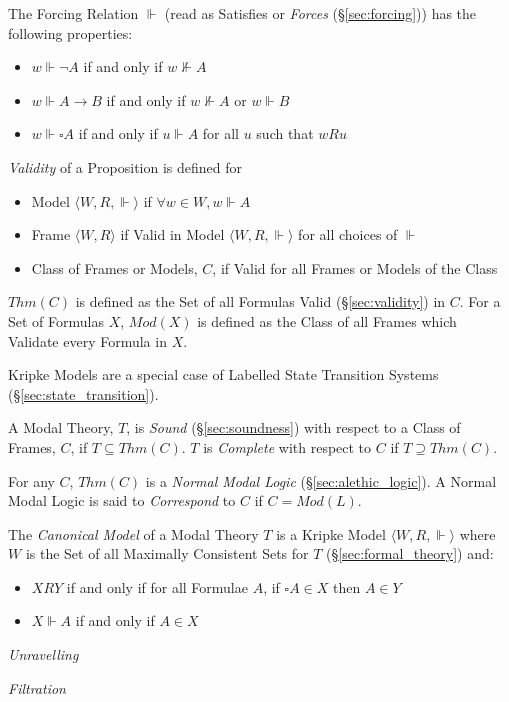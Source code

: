 The Forcing Relation $\Vdash$ (read as Satisfies or \emph{Forces}
(\S\ref{sec:forcing})) has the following properties:
\begin{itemize}
\item $w \Vdash \neg A$ if and only if $w \nVdash A$
\item $w \Vdash A \rightarrow B$ if and only if $w \nVdash A$ or $w
  \Vdash B$
\item $w \Vdash \square A$ if and only if $u \Vdash A$ for all $u$
  such that $w R u$
\end{itemize}
\emph{Validity} of a Proposition is defined for
\begin{itemize}
\item Model $\langle W,R, \Vdash \rangle$ if $\forall w \in W,
  w \Vdash A$
\item Frame $\langle W,R \rangle$ if Valid in Model $\langle W,R,
  \Vdash \rangle$ for all choices of $\Vdash$
\item Class of Frames or Models, $C$, if Valid for all Frames or
  Models of the Class
\end{itemize}
$Thm(C)$ is defined as the Set of all Formulas Valid
(\S\ref{sec:validity}) in $C$. For a Set of Formulas $X$,
$Mod(X)$ is defined as the Class of all Frames which Validate every
Formula in $X$.

Kripke Models are a special case of Labelled State Transition Systems
(\S\ref{sec:state_transition}).

A Modal Theory, $T$, is \emph{Sound} (\S\ref{sec:soundness}) with
respect to a Class of Frames, $C$, if $T \subseteq Thm(C)$. $T$ is
\emph{Complete} with respect to $C$ if $T \supseteq Thm(C)$.

For any $C$, $Thm(C)$ is a \emph{Normal Modal Logic}
(\S\ref{sec:alethic_logic}). A Normal Modal Logic is said to
\emph{Correspond} to $C$ if $C = Mod(L)$.

The \emph{Canonical Model} of a Modal Theory $T$ is a Kripke Model
$\langle W,R, \Vdash \rangle$ where $W$ is the Set of all Maximally
Consistent Sets for $T$ (\S\ref{sec:formal_theory}) and:
\begin{itemize}
\item $XRY$ if and only if for all Formulae $A$, if $\square A
  \in X$ then $A \in Y$
\item $X\Vdash A$ if and only if $A \in X$
\end{itemize}


\emph{Unravelling}

\emph{Filtration}



